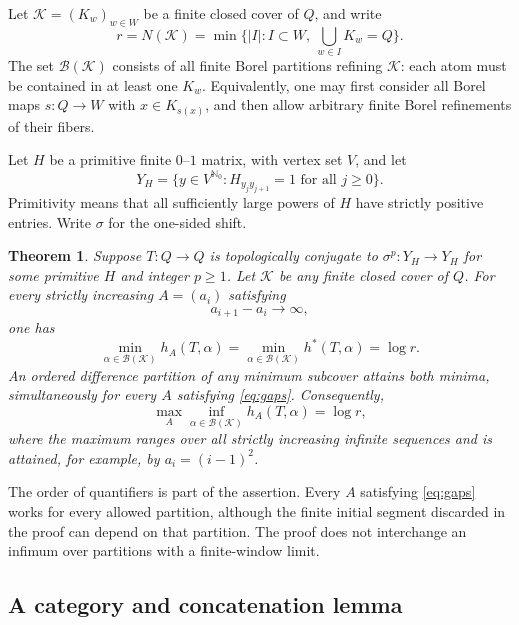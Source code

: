 \documentclass[11pt,reqno]{amsart}
\numberwithin{equation}{section}
\newtheorem{theorem}{Theorem}[section]
\theoremstyle{definition}
\theoremstyle{remark}
\newcommand{\Nzero}{\mathbb N_0}
\newcommand{\K}{\mathcal K}
\newcommand{\hpat}{h^{*}}
\begin{document}
Let $\K=(K_w)_{w\in W}$ be a finite closed cover of $Q$, and write
\[
 r=N(\K)=\min\{|I|:I\subset W,\ \bigcup_{w\in I}K_w=Q\}.
\]
The set $\mathcal B(\K)$ consists of all finite Borel partitions refining
$\K$: each atom must be contained in at least one $K_w$. Equivalently,
one may first consider all Borel maps $s:Q\to W$ with $x\in K_{s(x)}$,
and then allow arbitrary finite Borel refinements of their fibers.

Let $H$ be a primitive finite $0$--$1$ matrix, with vertex set $V$, and
let
\[
 Y_H=\{y\in V^{\Nzero}:H_{y_jy_{j+1}}=1\text{ for all }j\ge0\}.
\]
Primitivity means that all sufficiently large powers of $H$ have strictly
positive entries. Write $\sigma$ for the one-sided shift.

\begin{theorem}\label{thm:cover}
Suppose $T:Q\to Q$ is topologically conjugate to $\sigma^p:Y_H\to Y_H$
for some primitive $H$ and integer $p\ge1$. Let $\K$ be any finite closed
cover of $Q$. For every strictly increasing $A=(a_i)$ satisfying
\begin{equation}\label{eq:gaps}
 a_{i+1}-a_i\longrightarrow\infty,
\end{equation}
one has
\begin{equation}\label{eq:coverformula}
 \min_{\alpha\in\mathcal B(\K)} h_A(T,\alpha)
 =\min_{\alpha\in\mathcal B(\K)}\hpat(T,\alpha)
 =\log r.
\end{equation}
An ordered difference partition of any minimum subcover attains both
minima, simultaneously for every $A$ satisfying \eqref{eq:gaps}.
Consequently,
\begin{equation}\label{eq:coverminimax}
 \max_A\inf_{\alpha\in\mathcal B(\K)}h_A(T,\alpha)=\log r,
\end{equation}
where the maximum ranges over all strictly increasing infinite sequences
and is attained, for example, by $a_i=(i-1)^2$.
\end{theorem}

The order of quantifiers is part of the assertion. Every $A$ satisfying
\eqref{eq:gaps} works for every allowed partition, although the finite
initial segment discarded in the proof can depend on that partition.
The proof does not interchange an infimum over partitions with a
finite-window limit.

\subsection{A category and concatenation lemma}
\end{document}
